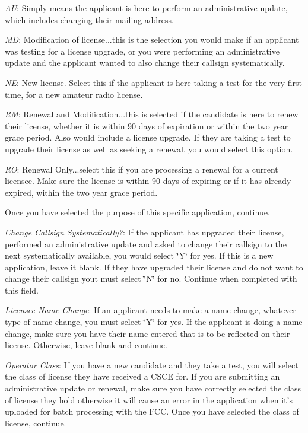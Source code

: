 \begin{DoxyItemize}
\begin{DoxyItemize}
\item {\itshape AU}\+: Simply means the applicant is here to perform an administrative update, which includes changing their mailing address.
\item {\itshape MD}\+: Modification of license...this is the selection you would make if an applicant was testing for a license upgrade, or you were performing an administrative update and the applicant wanted to also change their callsign systematically.
\item {\itshape NE}\+: New license. Select this if the applicant is here taking a test for the very first time, for a new amateur radio license.
\item {\itshape RM}\+: Renewal and Modification...this is selected if the candidate is here to renew their license, whether it is within 90 days of expiration or within the two year grace period. Also would include a license upgrade. If they are taking a test to upgrade their license as well as seeking a renewal, you would select this option.
\item {\itshape RO}\+: Renewal Only...select this if you are processing a renewal for a current licensee. Make sure the license is within 90 days of expiring or if it has already expired, within the two year grace period.
\item Once you have selected the purpose of this specific application, continue.
\end{DoxyItemize}
\item {\itshape Change Callsign Systematically?}\+: If the applicant has upgraded their license, performed an administrative update and asked to change their callsign to the next systematically available, you would select \char`\"{}\+Y\char`\"{} for yes. If this is a new application, leave it blank. If they have upgraded their license and do not want to change their callsign yout must select \char`\"{}\+N\char`\"{} for no. Continue when completed with this field.
\item {\itshape Licensee Name Change}\+: If an applicant needs to make a name change, whatever type of name change, you must select \char`\"{}\+Y\char`\"{} for yes. If the applicant is doing a name change, make sure you have their name entered that is to be reflected on their license. Otherwise, leave blank and continue.
\item {\itshape Operator Class}\+: If you have a new candidate and they take a test, you will select the class of license they have received a C\+S\+CE for. If you are submitting an administrative update or renewal, make sure you have correctly selected the class of license they hold otherwise it will cause an error in the application when it’s uploaded for batch processing with the F\+CC. Once you have selected the class of license, continue.

\end{DoxyItemize}
